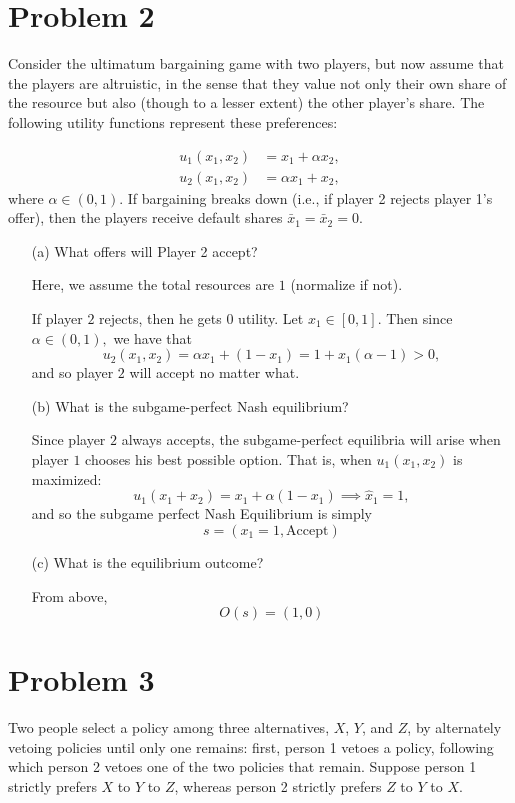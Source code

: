 \documentclass[11pt]{article}
\begin{document}
\section*{Problem 2}
Consider the ultimatum bargaining game with two players, but now assume that the players are altruistic, in the sense that they value not only their own share of the resource but also (though to a lesser extent) the other player’s share. The following utility functions represent these preferences:

\begin{align*}
    u_1 (x_1, x_2) &= x_1 + \alpha x_2, \\
    u_2 (x_1, x_2) &= \alpha x_1 + x_2,
\end{align*}
where $\alpha \in (0,1)$. If bargaining breaks down (i.e., if player 2 rejects player 1’s offer), then the players receive default shares $\bar{x}_1 = \bar{x}_2 = 0$.

\begin{enumerate}
    \item[(a)] What offers will Player 2 accept?
    \begin{solution}
    Here, we assume the total resources are $1$ (normalize if not). 
    
        If player $2$ rejects, then he gets $0$ utility. Let $x_1 \in [0,1].$ Then since $\alpha \in (0,1),$ we have that
        \[u_2(x_1, x_2) = \alpha x_1 + (1-x_1) = 1 + x_1(\alpha -1) >0,\] and so player $2$ will accept no matter what. 
    \end{solution}
    \item[(b)] What is the subgame-perfect Nash equilibrium?
    \begin{solution}
        Since player $2$ always accepts, the subgame-perfect equilibria will arise when player $1$ chooses his best possible option. That is, when $u_1(x_1, x_2)$ is maximized:
        \[u_1(x_1 + x_2) = x_1 + \alpha(1 - x_1) \implies \hat{x}_1 = 1,\] and so the subgame perfect Nash Equilibrium is simply 
        \[\boxed{s = (x_1 = 1, \text{Accept})}\]
    \end{solution}
    \item[(c)] What is the equilibrium outcome?
    \begin{solution}
        From above, 
        \[\boxed{O(s) = (1, 0)}\]
    \end{solution}
\end{enumerate}

\section*{Problem 3}
Two people select a policy among three alternatives, $X$, $Y$, and $Z$, by alternately vetoing policies until only one remains: first, person 1 vetoes a policy, following which person 2 vetoes one of the two policies that remain. Suppose person 1 strictly prefers $X$ to $Y$ to $Z$, whereas person 2 strictly prefers $Z$ to $Y$ to $X$.
\end{document}
